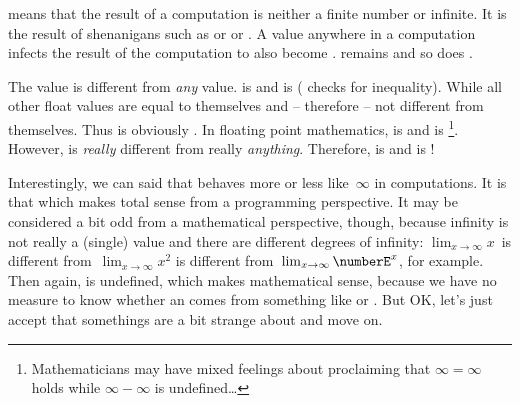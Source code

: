  means that the result of a computation is neither a finite number or infinite.
It is the result of shenanigans such as  or  or .
A  value anywhere in a computation infects the result of the computation to also become .
 remains  and so does .

The value  is different from \emph{any} value.
 is  and  is  (\pythonil{!=} checks for inequality).
While all other float values are equal to themselves and -- therefore -- not different from themselves.
Thus  is obviously .
In floating point mathematics,  is  and  is \footnote{%
Mathematicians may have mixed feelings about proclaiming that $\infty=\infty$ holds while $\infty-\infty$ is undefined\dots}.
However,  is \emph{really} different from really \emph{anything}.
Therefore, \pythonIdx{==} is  and  is !

Interestingly, we can said that  behaves more or less like~$\infty$ in computations.
It is  that  which makes total sense from a programming perspective.
It may  be considered a bit odd from a mathematical perspective, though, because infinity is not really a (single) value and there are different degrees of infinity: $\lim_{x\rightarrow\infty} x$~is different from~$\lim_{x\rightarrow\infty} x^2$ is different from~$\lim_{x\rightarrow\infty} \numberE^x$, for example.
Then again,  is undefined, which makes  mathematical sense, because we have no measure to know whether an  comes from something like  or .
But OK, let's just accept that somethings are a bit strange about  and move on.

%
%

